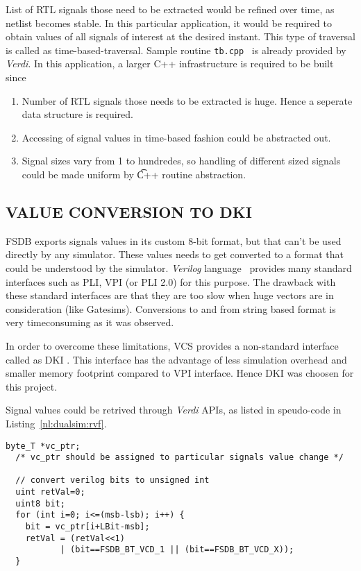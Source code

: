 List of RTL signals those need to be extracted would be refined over time, as netlist becomes stable. In this particular application, it would  be required  to obtain values of all signals of interest at the desired  instant. This type of traversal is called as time-based-traversal. Sample routine \texttt{tb.cpp}~\citep{Verdi:FsdbReader} is already provided by {\it Verdi}. In this application, a larger C++ infrastructure is required to be built since
\begin{enumerate}
\item Number of RTL signals those needs to be extracted is huge. Hence a seperate data structure is required.
\item Accessing of signal values in time-based fashion could be abstracted out.
\item Signal sizes vary from 1 to hundredes, so handling of different sized signals could be made uniform by {\t C++} routine abstraction.
\end{enumerate}


\subsection{VALUE CONVERSION TO DKI}
FSDB exports signals values in its custom 8-bit format, but that can't be used directly by any simulator. These values needs to get converted to a format that could be understood by the simulator. {\it Verilog} language~\citep{ieee:v:2005} provides many standard interfaces such as PLI, VPI (or PLI 2.0) for this purpose. The drawback with these standard interfaces are that they are too slow when huge vectors are in consideration (like Gatesims). Conversions to and from string based format is very timeconsuming as it was observed.

In order to overcome these limitations, VCS provides a non-standard interface called as DKI . This interface has the advantage of less simulation overhead and smaller memory footprint compared to VPI interface. Hence DKI was choosen for this project.


Signal values could be retrived through {\it Verdi} APIs, as listed in speudo-code in Listing~\ref{nl:dualsim:rvf}.

\lstset{language=C++,
basicstyle=\footnotesize,
frame=shadowbox,
breaklines=true}          
\begin{lstlisting}[frame=single, caption=Retrieving Values from FSDB,label=nl:dualsim:rvf] 
  byte_T *vc_ptr;
  /* vc_ptr should be assigned to particular signals value change */

  // convert verilog bits to unsigned int
  uint retVal=0;
  uint8 bit;
  for (int i=0; i<=(msb-lsb); i++) {
    bit = vc_ptr[i+LBit-msb];
    retVal = (retVal<<1)
           | (bit==FSDB_BT_VCD_1 || (bit==FSDB_BT_VCD_X));
  }
\end{lstlisting}
\renewcommand{\lstlistingname}{Code}

